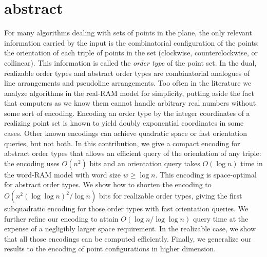 \section{abstract}
	For many algorithms dealing with sets of points in the plane, the only
	relevant information carried by the input is the combinatorial
	configuration of the points: the orientation of each triple of points in
	the set (clockwise, counterclockwise, or collinear). This information is
	called the \emph{order type} of the point set.
%
	In the dual, realizable order types and abstract order types are
	combinatorial analogues of line arrangements and pseudoline arrangements.
%
	Too often in the literature we analyze algorithms in the
	real-RAM model for simplicity, putting aside the fact that computers as we
	know them cannot handle arbitrary real numbers without some sort of
	encoding.
%
	Encoding an order type by the integer coordinates of a realizing point
	set is known to yield doubly exponential coordinates in some cases. Other
	known encodings can achieve quadratic space or fast orientation queries,
	but not both.
%
	In this contribution, we give a compact encoding for abstract order types
	that allows an efficient query of the orientation of any triple: the encoding
	uses \( O(n^2) \) bits and an orientation query takes \(O(\log n)\) time in
	the word-RAM model with word size \(w \geq \log n\).
%
	This encoding is space-optimal for abstract order types. We show how to
	shorten the encoding to \(O(n^2 {(\log\log n)}^2 / \log n)\) bits for
	realizable order types, giving the first subquadratic encoding for those
	order types with fast orientation queries.
%
	We further refine our encoding to attain \(O(\log n/\log\log n)\)
	query time at the expense of a negligibly larger space requirement.
%
	In the realizable case, we show that all those encodings can be computed
	efficiently.
%
	Finally, we generalize our results to the encoding of point configurations
	in higher dimension.
